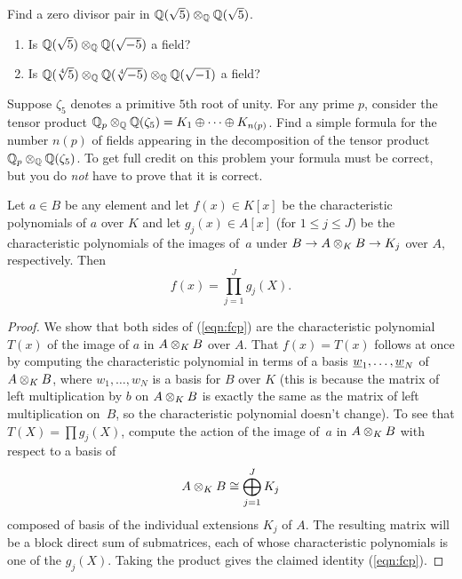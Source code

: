 \begin{exercise}\label{ex:normed3}
Find a zero divisor pair in $\mathbb{Q}(\sqrt{5})\otimes_{\mathbb{Q}}\mathbb{Q}(\sqrt{5})$.
\end{exercise}

\begin{exercise}\label{ex:normed4}
\begin{enumerate}
\item Is $\mathbb{Q}(\sqrt{5})\otimes_{\mathbb{Q}}\mathbb{Q}(\sqrt{-5})$ a field?
\item Is $\mathbb{Q}(\sqrt[4]{5})\otimes_{\mathbb{Q}}\mathbb{Q}(\sqrt[4]{-5})\otimes_{\mathbb{Q}}\mathbb{Q}(\sqrt{-1})$ a field?
\end{enumerate}
\end{exercise}

\begin{exercise}\label{ex:normed5}
  Suppose $\zeta_5$ denotes a primitive $5$th root of unity.  For
  any prime $p$, consider the tensor product $\mathbb{Q}_p \otimes_{\mathbb{Q}}
  \mathbb{Q}(\zeta_5) = K_1\oplus \cdots \oplus K_{n(p)}$.  Find a simple
  formula for the number $n(p)$ of fields appearing in the
  decomposition of the tensor product $\mathbb{Q}_p \otimes_{\mathbb{Q}} \mathbb{Q}(\zeta_5)$.
  To get full credit on this problem your formula must be correct, but
  you do {\em not} have to prove that it is correct.
\end{exercise}



\begin{corollary}\label{cor:fcp}
  Let $a\in B$ be any element and let $f(x)\in K[x]$ be the
  characteristic polynomials of $a$ over $K$ and let $g_j(x)\in A[x]$
  (for $1\leq j \leq J$) be the characteristic polynomials of the
  images of~$a$ under $B\to A\otimes_K B \to K_j$ over $A$,
  respectively.  Then
\begin{equation}\label{eqn:fcp}
  f(x) = \prod_{j=1}^J g_j(X).
\end{equation}
\end{corollary}
\begin{proof}
  We show that both sides of (\ref{eqn:fcp}) are the characteristic
  polynomial $T(x)$ of the image of $a$ in $A\otimes_K B$ over $A$.
  That $f(x)=T(x)$ follows at once by computing the characteristic
  polynomial in terms of a basis $\underline{w}_1,\ldots, \underline{w}_N$ of $A\otimes_K
  B$, where $w_1,\ldots, w_N$ is a basis for $B$ over $K$ (this is
  because the matrix of left multiplication by $b$ on $A \otimes_K B$
  is exactly the same as the matrix of left multiplication on~$B$, so
  the characteristic polynomial doesn't change).  To see that $T(X) =
  \prod g_j(X)$, compute the action of the image of~$a$ in $A\otimes_K
  B$ with respect to a basis of
\begin{equation}\label{eqn:decomp}
  A\otimes_K B \cong \bigoplus_{j=1}^J K_j
\end{equation}
composed of basis of the individual extensions $K_j$ of $A$.  The
  resulting matrix will be a block direct sum of submatrices, each of
  whose characteristic polynomials is one of the $g_j(X)$.  Taking
  the product gives the claimed identity (\ref{eqn:fcp}).
\end{proof}

